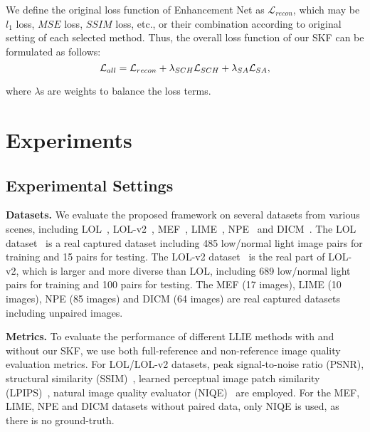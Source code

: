 \documentclass[10pt,twocolumn,letterpaper]{article}
\begin{document}
We define the original loss function of Enhancement Net as $\mathcal{L}_{recon}$, which may be $l_1$ loss, $MSE$ loss, $SSIM$ loss, etc., or their combination according to original setting of each selected method. Thus, the overall loss function of our SKF can be formulated as follows:
\vspace{-0.1cm}
\begin{equation}
  \mathcal{L}_{all}=\mathcal{L}_{recon} + \lambda_{SCH}\mathcal{L}_{SCH} + \lambda_{SA}\mathcal{L}_{SA},
  \label{eq:saloss5}
  \vspace{-0.1cm}
\end{equation}

where $\lambda$s are weights to balance the loss terms. 

\vspace{-0.15cm}
\section{Experiments}
\vspace{-0.05cm}
\subsection{Experimental Settings}
\vspace{-0.05cm}

\textbf{Datasets.} We evaluate the proposed framework on several datasets from various scenes, including LOL~\cite{Chen2018Retinex}, LOL-v2~\cite{yang2021sparse}, MEF~\cite{ma2015mef}, LIME~\cite{guo2016lime-mm}, NPE~\cite{wang2013npe} and DICM~\cite{lee2013dicm}. The LOL dataset~\cite{Chen2018Retinex} is a real captured dataset including 485 low/normal light image pairs for training and 15 pairs for testing. The LOL-v2 dataset~\cite{yang2021sparse} is the real part of LOL-v2, which is larger and more diverse than LOL, including 689 low/normal light pairs for training and 100 pairs for testing. The MEF (17 images), LIME (10 images), NPE (85 images) and DICM (64 images) are real captured datasets including unpaired images.

\textbf{Metrics.} To evaluate the performance of different LLIE methods with and without our SKF, we use both full-reference and non-reference image quality evaluation metrics. For LOL/LOL-v2 datasets, peak signal-to-noise ratio (PSNR), structural similarity (SSIM)~\cite{wang2004ssim}, learned perceptual image patch similarity (LPIPS)~\cite{zhang2018lpips}, natural image quality evaluator (NIQE)~\cite{mittal2012niqe} are employed. For the MEF, LIME, NPE and DICM datasets without paired data, only NIQE is used, as there is no ground-truth.
\end{document}
